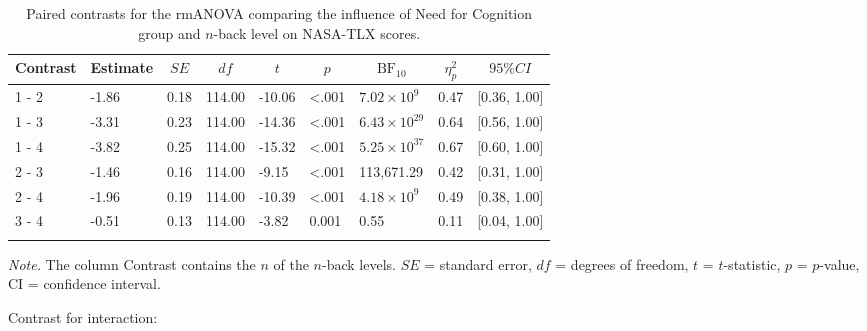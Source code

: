 \documentclass[
  man,floatsintext]{apa6}
\begin{document}
\begin{table}[H]

\begin{center}
\begin{threeparttable}

\caption{\label{tab:unnamed-chunk-12}Paired contrasts for the rmANOVA comparing the influence of Need for Cognition group and $n$-back level on NASA-TLX scores.}

\begin{tabular}{lllllllll}
\toprule
Contrast & \multicolumn{1}{c}{Estimate} & \multicolumn{1}{c}{$SE$} & \multicolumn{1}{c}{$df$} & \multicolumn{1}{c}{$t$} & \multicolumn{1}{c}{$p$} & \multicolumn{1}{c}{$\mathrm{BF}_{\textrm{10}}$} & \multicolumn{1}{c}{$\eta_{p}^{2}$} & \multicolumn{1}{c}{$95\% CI$}\\
\midrule
1 - 2 & -1.86 & 0.18 & 114.00 & -10.06 & <.001 & $7.02 \times 10^{9}$ & 0.47 & {}[0.36, 1.00]\\
1 - 3 & -3.31 & 0.23 & 114.00 & -14.36 & <.001 & $6.43 \times 10^{29}$ & 0.64 & {}[0.56, 1.00]\\
1 - 4 & -3.82 & 0.25 & 114.00 & -15.32 & <.001 & $5.25 \times 10^{37}$ & 0.67 & {}[0.60, 1.00]\\
2 - 3 & -1.46 & 0.16 & 114.00 & -9.15 & <.001 & 113,671.29 & 0.42 & {}[0.31, 1.00]\\
2 - 4 & -1.96 & 0.19 & 114.00 & -10.39 & <.001 & $4.18 \times 10^{9}$ & 0.49 & {}[0.38, 1.00]\\
3 - 4 & -0.51 & 0.13 & 114.00 & -3.82 & 0.001 & 0.55 & 0.11 & {}[0.04, 1.00]\\
\bottomrule
\addlinespace
\end{tabular}

\begin{tablenotes}[para]
\normalsize{\textit{Note.} The column Contrast contains the $n$ of the $n$-back levels. $SE$ = standard error, $df$ = degrees of freedom, $t$ = $t$-statistic, $p$ = $p$-value, CI = confidence interval.}
\end{tablenotes}

\end{threeparttable}
\end{center}

\end{table}

Contrast for interaction:
\end{document}
